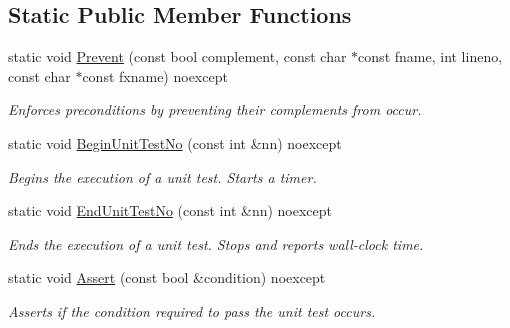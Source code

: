 \subsection*{Static Public Member Functions}
\begin{DoxyCompactItemize}
\item 
static void \hyperlink{classmtk_1_1Tools_a332324c6f25e66be9dff48c5987a3b9f}{Prevent} (const bool complement, const char $\ast$const fname, int lineno, const char $\ast$const fxname) noexcept
\begin{DoxyCompactList}\small\item\em Enforces preconditions by preventing their complements from occur. \end{DoxyCompactList}\item 
static void \hyperlink{classmtk_1_1Tools_afc29ecaf337a13ed2e817d3890a5a441}{Begin\+Unit\+Test\+No} (const int \&nn) noexcept
\begin{DoxyCompactList}\small\item\em Begins the execution of a unit test. Starts a timer. \end{DoxyCompactList}\item 
static void \hyperlink{classmtk_1_1Tools_aba67d9dc35c9c1c49430fcc9ea035e03}{End\+Unit\+Test\+No} (const int \&nn) noexcept
\begin{DoxyCompactList}\small\item\em Ends the execution of a unit test. Stops and reports wall-\/clock time. \end{DoxyCompactList}\item 
static void \hyperlink{classmtk_1_1Tools_ac6804df469c94ab6a796fb64f1e44a89}{Assert} (const bool \&condition) noexcept
\begin{DoxyCompactList}\small\item\em Asserts if the condition required to pass the unit test occurs. \end{DoxyCompactList}\end{DoxyCompactItemize}
